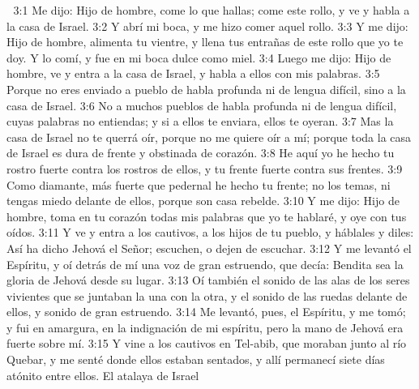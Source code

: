 
3:1 Me dijo: Hijo de hombre, come lo que hallas; come este rollo, y ve y habla a la casa de Israel.  
3:2 Y abrí mi boca, y me hizo comer aquel rollo.  
3:3 Y me dijo: Hijo de hombre, alimenta tu vientre, y llena tus entrañas de este rollo que yo te doy. Y lo comí, y fue en mi boca dulce como miel. 
3:4 Luego me dijo: Hijo de hombre, ve y entra a la casa de Israel, y habla a ellos con mis palabras. 
3:5 Porque no eres enviado a pueblo de habla profunda ni de lengua difícil, sino a la casa de Israel.  
3:6 No a muchos pueblos de habla profunda ni de lengua difícil, cuyas palabras no entiendas; y si a ellos te enviara, ellos te oyeran.  
3:7 Mas la casa de Israel no te querrá oír, porque no me quiere oír a mí; porque toda la casa de Israel es dura de frente y obstinada de corazón.  
3:8 He aquí yo he hecho tu rostro fuerte contra los rostros de ellos, y tu frente fuerte contra sus frentes.  
3:9 Como diamante, más fuerte que pedernal he hecho tu frente; no los temas, ni tengas miedo delante de ellos, porque son casa rebelde.  
3:10 Y me dijo: Hijo de hombre, toma en tu corazón todas mis palabras que yo te hablaré, y oye con tus oídos.  
3:11 Y ve y entra a los cautivos, a los hijos de tu pueblo, y háblales y diles: Así ha dicho Jehová el Señor; escuchen, o dejen de escuchar.  
3:12 Y me levantó el Espíritu, y oí detrás de mí una voz de gran estruendo, que decía: Bendita sea la gloria de Jehová desde su lugar.  
3:13 Oí también el sonido de las alas de los seres vivientes que se juntaban la una con la otra, y el sonido de las ruedas delante de ellos, y sonido de gran estruendo.  
3:14 Me levantó, pues, el Espíritu, y me tomó; y fui en amargura, en la indignación de mi espíritu, pero la mano de Jehová era fuerte sobre mí.  
3:15 Y vine a los cautivos en Tel-abib, que moraban junto al río Quebar, y me senté donde ellos estaban sentados, y allí permanecí siete días atónito entre ellos.  
El atalaya de Israel  
  
